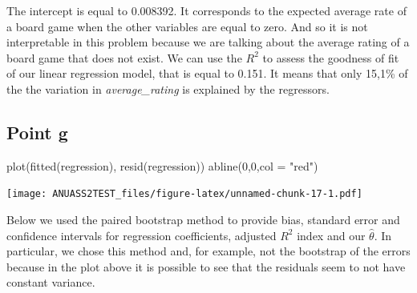 \documentclass[
]{article}
\newenvironment{Shaded}{\begin{snugshade}}{\end{snugshade}}
\newcommand{\AttributeTok}[1]{\textcolor[rgb]{0.77,0.63,0.00}{#1}}
\newcommand{\DecValTok}[1]{\textcolor[rgb]{0.00,0.00,0.81}{#1}}
\newcommand{\FunctionTok}[1]{\textcolor[rgb]{0.00,0.00,0.00}{#1}}
\newcommand{\NormalTok}[1]{#1}
\newcommand{\StringTok}[1]{\textcolor[rgb]{0.31,0.60,0.02}{#1}}
\begin{document}
The intercept is equal to 0.008392. It corresponds to the expected
average rate of a board game when the other variables are equal to zero.
And so it is not interpretable in this problem because we are talking
about the average rating of a board game that does not exist. We can use
the \(R^2\) to assess the goodness of fit of our linear regression
model, that is equal to 0.151. It means that only 15,1\% of the the
variation in \emph{average\_rating} is explained by the regressors.

\hypertarget{point-g}{%
\subsection{Point g}\label{point-g}}

\begin{Shaded}
\begin{Highlighting}[]
\FunctionTok{plot}\NormalTok{(}\FunctionTok{fitted}\NormalTok{(regression), }\FunctionTok{resid}\NormalTok{(regression))}
\FunctionTok{abline}\NormalTok{(}\DecValTok{0}\NormalTok{,}\DecValTok{0}\NormalTok{,}\AttributeTok{col =} \StringTok{"red"}\NormalTok{)}
\end{Highlighting}
\end{Shaded}

\texttt{[image: ANUASS2TEST\_files/figure-latex/unnamed-chunk-17-1.pdf]}

Below we used the paired bootstrap method to provide bias, standard
error and confidence intervals for regression coefficients, adjusted
\(R^2\) index and our \(\hat{\theta}\). In particular, we chose this
method and, for example, not the bootstrap of the errors because in the
plot above it is possible to see that the residuals seem to not have
constant variance.
\end{document}
